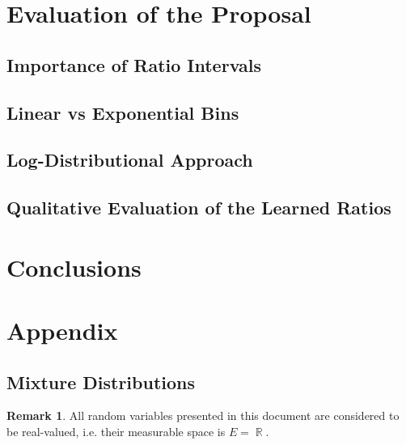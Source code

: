 \documentclass[12pt,a4paper,openright,twoside]{article}
\DeclareMathOperator*{\R}{\mathbb{R}}
\numberwithin{equation}{section}
\theoremstyle{definition}
\newtheorem*{remark}{Remark}
\theoremstyle{remark}
\theoremstyle{plain}
\begin{document}
\newpage 
\thispagestyle{plain}
\section{Evaluation of the Proposal}


\subsection*{Importance of Ratio Intervals}



\subsection*{Linear vs Exponential Bins}


\subsection*{Log-Distributional Approach}


\subsection*{Qualitative Evaluation of the Learned Ratios}




\newpage

\thispagestyle{plain}
\section{Conclusions}


\newpage

\appendix
\pagestyle{fancy}
\renewcommand{\sectionmark}[1]{\markboth{#1}{}}
\renewcommand{\subsectionmark}[1]{\markright{\thesubsection.\quad #1}}

\thispagestyle{plain}
\section*{Appendix}
\sectionmark{Appendix}

\setcounter{section}{1}
\setcounter{theorem}{0}
\setcounter{definition}{0}
\setcounter{equation}{0}

\subsection{Mixture Distributions}

\begin{remark}
All random variables presented in this document are considered to be real-valued, i.e. their measurable space is $E= \R$. 
\end{remark}
\end{document}
